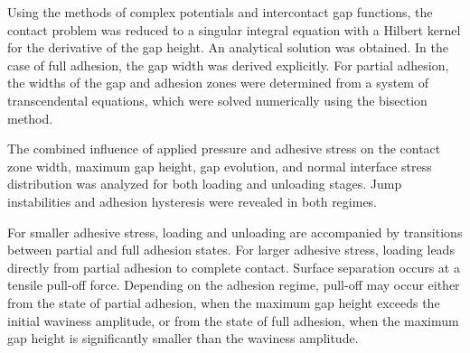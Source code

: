 Using the methods of complex potentials and intercontact gap functions, the contact problem was reduced to a singular integral equation with a Hilbert kernel for the derivative of the gap height. An analytical solution was obtained. In the case of full adhesion, the gap width was derived explicitly. For partial adhesion, the widths of the gap and adhesion zones were determined from a system of transcendental equations, which were solved numerically using the bisection method.

The combined influence of applied pressure and adhesive stress on the contact zone width, maximum gap height, gap evolution, and normal interface stress distribution was analyzed for both loading and unloading stages. Jump instabilities and adhesion hysteresis were revealed in both regimes.

For smaller adhesive stress, loading and unloading are accompanied by transitions between partial and full adhesion states. For larger adhesive stress, loading leads directly from partial adhesion to complete contact. Surface separation occurs at a tensile pull-off force. Depending on the adhesion regime, pull-off may occur either from the state of partial adhesion, when the maximum gap height exceeds the initial waviness amplitude, or from the state of full adhesion, when the maximum gap height is significantly smaller than the waviness amplitude.


